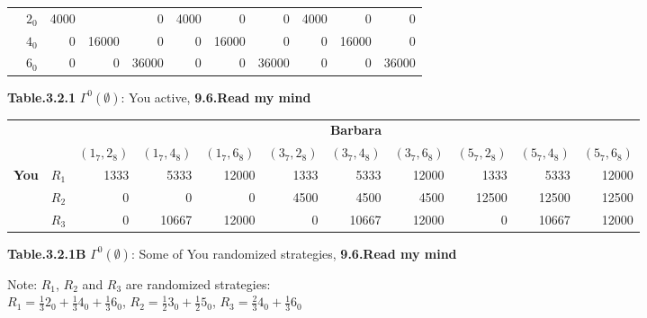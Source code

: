 \documentclass{article}
\begin{document}
\begin{description}
\begin{center}
\begin{tabular}{rrrrrrrrrrr}
        \multicolumn{ 1}{c}{{\bf }} &        $2_0$ &       4000 &            &          0 &       4000 &          0 &          0 &       4000 &          0 &          0 \\

        \multicolumn{ 1}{c}{{\bf }} &        $4_0$ &          0 &      16000 &          0 &          0 &      16000 &          0 &          0 &      16000 &          0 \\

        \multicolumn{ 1}{c}{{\bf }} &        $6_0$ &          0 &          0 &      36000 &          0 &          0 &      36000 &          0 &          0 &      36000 \\
        \hline
        \hline
        \end{tabular}

        {\bf Table.3.2.1 }$\Gamma ^0(\emptyset )$: You active, {\bf 9.6.Read my mind}
\end{center}

    \begin{center}
        \begin{tabular}{rrrrrrrrrrr}
        \hline
        \hline
                   &            &                                                                                 \multicolumn{ 9}{c}{{\bf Barbara}} \\

                   &            &  $(1_7,2_8)$ &  $(1_7,4_8)$ &  $(1_7,6_8)$ &  $(3_7,2_8)$ &  $(3_7,4_8)$ &  $(3_7,6_8)$ &  $(5_7,2_8)$ &  $(5_7,4_8)$ &  $(5_7,6_8)$ \\
        \hline
        \multicolumn{ 1}{c}{{\bf You}} &        $R_1$ &       1333 &       5333 &      12000 &       1333 &       5333 &      12000 &       1333 &       5333 &      12000 \\

        \multicolumn{ 1}{c}{{\bf }} &        $R_2$ &          0 &          0 &          0 &       4500 &       4500 &       4500 &      12500 &      12500 &      12500 \\

        \multicolumn{ 1}{c}{{\bf }} &        $R_3$ &          0 &      10667 &      12000 &          0 &      10667 &      12000 &          0 &      10667 &      12000 \\
        \hline
        \hline
        \end{tabular}

         {\bf Table.3.2.1B }$\Gamma ^0(\emptyset )$: Some of You randomized strategies, {\bf 9.6.Read my mind}
    \end{center}
      Note: $R_1$, $R_2$ and $R_3$ are randomized strategies:\\
    $R_1=\frac{1}{3}2_0+\frac{1}{3}4_0+\frac{1}{3}6_0$, $R_2=\frac{1}{2}3_0+\frac{1}{2}5_0$, $R_3=\frac{2}{3}4_0+\frac{1}{3}6_0$\\


\end{description}
\end{document}
